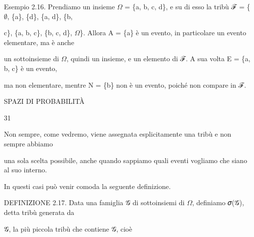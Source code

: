 \documentclass[a4paper,portrait,12pt]{article}
\begin{document}
\begin{flushleft}
Esempio 2.16. Prendiamo un insieme $\Omega$ = \{a, b, c, d\}, e su di esso la tribù ℱ = \{$\emptyset$, \{a\}, \{d\}, \{a, d\}, \{b,
\end{flushleft}


\begin{flushleft}
c\}, \{a, b, c\}, \{b, c, d\}, $\Omega$\}. Allora A = \{a\} \`{e} un evento, in particolare un evento elementare, ma \`{e} anche
\end{flushleft}


\begin{flushleft}
un sottoinsieme di $\Omega$, quindi un insieme, e un elemento di ℱ. A sua volta E = \{a, b, c\} \`{e} un evento,
\end{flushleft}


\begin{flushleft}
ma non elementare, mentre N = \{b\} non \`{e} un evento, poich\'{e} non compare in ℱ.
\end{flushleft}





\begin{flushleft}
 SPAZI DI PROBABILIT\`{A}
\end{flushleft}





31





\begin{flushleft}
Non sempre, come vedremo, viene assegnata esplicitamente una tribù e non sempre abbiamo
\end{flushleft}


\begin{flushleft}
una sola scelta possibile, anche quando sappiamo quali eventi vogliamo che siano al suo interno.
\end{flushleft}


\begin{flushleft}
In questi casi pu\`{o} venir comoda la seguente definizione.
\end{flushleft}


\begin{flushleft}
DEFINIZIONE 2.17. Data una famiglia 𝒢 di sottoinsiemi di $\Omega$, definiamo 𝜎(𝒢), detta tribù generata da
\end{flushleft}


\begin{flushleft}
𝒢, la più piccola tribù che contiene 𝒢, cio\`{e}
\end{flushleft}
\end{document}
